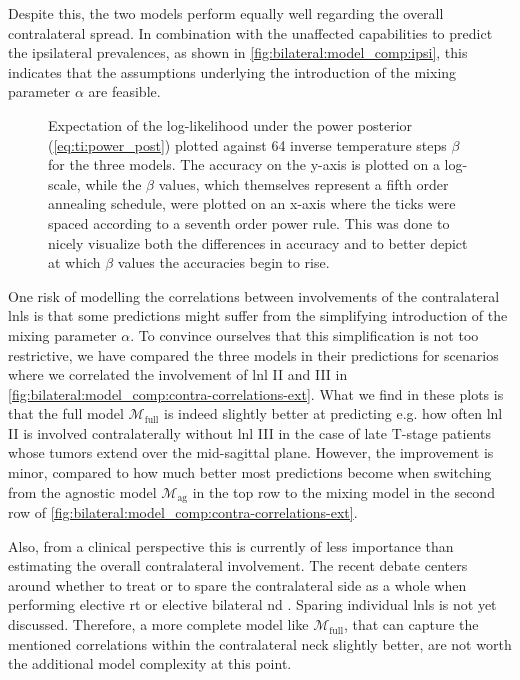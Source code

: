 \documentclass[\relativeRoot/main.tex]{subfiles}
\begin{document}
Despite this, the two models perform equally well regarding the overall contralateral spread. In combination with the unaffected capabilities to predict the ipsilateral prevalences, as shown in \cref{fig:bilateral:model_comp:ipsi}, this indicates that the assumptions underlying the introduction of the mixing parameter $\alpha$ are feasible.

\begin{figure}
    \centering
    
    \caption[Plotted accuracy over the course of a thermodynamic integration round]{
        Expectation of the log-likelihood under the power posterior (\cref{eq:ti:power_post}) plotted against 64 inverse temperature steps $\beta$ for the three models. The accuracy on the y-axis is plotted on a log-scale, while the $\beta$ values, which themselves represent a fifth order annealing schedule, were plotted on an x-axis where the ticks were spaced according to a seventh order power rule. This was done to nicely visualize both the differences in accuracy and to better depict at which $\beta$ values the accuracies begin to rise.
    }
    \label{fig:bilateral:model_comp:thermo_int}
\end{figure}

One risk of modelling the correlations between involvements of the contralateral \glspl{lnl} is that some predictions might suffer from the simplifying introduction of the mixing parameter $\alpha$. To convince ourselves that this simplification is not too restrictive, we have compared the three models in their predictions for scenarios where we correlated the involvement of \gls{lnl} II and III in \cref{fig:bilateral:model_comp:contra-correlations-ext}. What we find in these plots is that the full model $\mathcal{M}_\text{full}$ is indeed slightly better at predicting e.g. how often \gls{lnl} II is involved contralaterally without \gls{lnl} III in the case of late T-stage patients whose tumors extend over the mid-sagittal plane. However, the improvement is minor, compared to how much better most predictions become when switching from the agnostic model $\mathcal{M}_\text{ag}$ in the top row to the mixing model in the second row of \cref{fig:bilateral:model_comp:contra-correlations-ext}.

Also, from a clinical perspective this is currently of less importance than estimating the overall contralateral involvement. The recent debate centers around whether to treat or to spare the contralateral side as a whole when performing elective \gls{rt} or elective bilateral \gls{nd} \cite{biau_selection_2019,al-mamgani_contralateral_2017}. Sparing individual \glspl{lnl} is not yet discussed. Therefore, a more complete model like $\mathcal{M}_\text{full}$, that can capture the mentioned correlations within the contralateral neck slightly better, are not worth the additional model complexity at this point.
\end{document}

